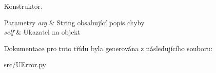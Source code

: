 Konstruktor. 


\begin{DoxyParams}{Parametry}
{\em arg} & String obsahující popis chyby \\
\hline
{\em self} & Ukazatel na objekt \\
\hline
\end{DoxyParams}


Dokumentace pro tuto třídu byla generována z následujícího souboru\-:\begin{DoxyCompactItemize}
\item 
src/U\-Error.\-py\end{DoxyCompactItemize}
